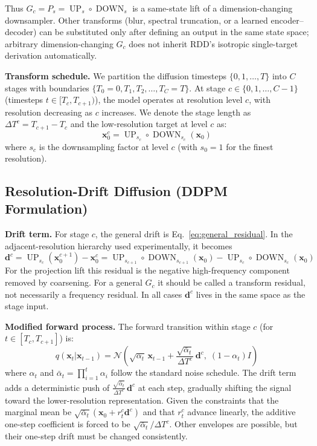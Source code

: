 \documentclass[10pt]{article}
\DeclareMathOperator{\DOWN}{DOWN}
\DeclareMathOperator{\UP}{UP}
\newcommand{\N}{\mathcal{N}}
\newcommand{\bx}{\bm{x}}
\newcommand{\bd}{\bm{d}}
\begin{document}
Thus $G_c=P_s=\UP_s\circ\DOWN_s$ is a same-state lift of a dimension-changing downsampler. Other transforms (blur, spectral truncation, or a learned encoder--decoder) can be substituted only after defining an output in the same state space; arbitrary dimension-changing $G_c$ does not inherit RDD's isotropic single-target derivation automatically.

\textbf{Transform schedule.} We partition the diffusion timesteps $\{0, 1, \ldots, T\}$ into $C$ stages with boundaries $\{T_0 = 0, T_1, T_2, \ldots, T_C = T\}$.
At stage $c \in \{0, 1, \ldots, C-1\}$ (timesteps $t \in [T_c, T_{c+1})$), the model operates at resolution level $c$, with resolution decreasing as $c$ increases.
We denote the stage length as $\Delta T^c = T_{c+1} - T_c$ and the low-resolution target at level $c$ as:
\begin{equation}
    \bx_0^c = \UP_{s_c} \circ \DOWN_{s_c}(\bx_0)
\end{equation}
where $s_c$ is the downsampling factor at level $c$ (with $s_0 = 1$ for the finest resolution).

\subsection{Resolution-Drift Diffusion (DDPM Formulation)}
\label{sec:rdd_ddpm}

\textbf{Drift term.} For stage $c$, the general drift is Eq.~\eqref{eq:general_residual}. In the adjacent-resolution hierarchy used experimentally, it becomes
\begin{equation}
    \bd^c = \UP_{s_c}(\bx_0^{c+1}) - \bx_0^c = \UP_{s_{c+1}} \circ \DOWN_{s_{c+1}}(\bx_0) - \UP_{s_c} \circ \DOWN_{s_c}(\bx_0)
    \label{eq:drift}
\end{equation}
For the projection lift this residual is the negative high-frequency component removed by coarsening. For a general $G_c$ it should be called a transform residual, not necessarily a frequency residual. In all cases $\bd^c$ lives in the same space as the stage input.

\textbf{Modified forward process.} The forward transition within stage $c$ (for $t \in [T_c, T_{c+1}]$) is:
\begin{equation}
    q(\bx_t | \bx_{t-1}) = \N\left(\sqrt{\alpha_t}\, \bx_{t-1} + \frac{\sqrt{\bar{\alpha}_t}}{\Delta T^c}\, \bd^c,\; (1 - \alpha_t) I\right)
    \label{eq:forward_step}
\end{equation}
where $\alpha_t$ and $\bar{\alpha}_t = \prod_{i=1}^{t} \alpha_i$ follow the standard noise schedule.
The drift term adds a deterministic push of $\frac{\sqrt{\bar{\alpha}_t}}{\Delta T^c}\, \bd^c$ at each step, gradually shifting the signal toward the lower-resolution representation.
Given the constraints that the marginal mean be $\sqrt{\bar\alpha_t}(\bx_0+r_t^c\bd^c)$ and that $r_t^c$ advance linearly, the additive one-step coefficient is forced to be $\sqrt{\bar\alpha_t}/\Delta T^c$. Other envelopes are possible, but their one-step drift must be changed consistently.
\end{document}
